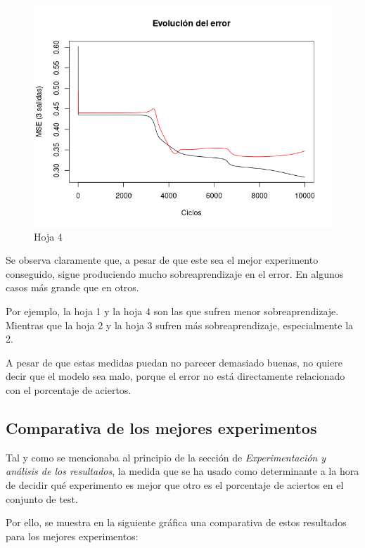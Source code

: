 \documentclass{uc3mpracticas}
\begin{document}
\begin{figure}[!h]
\begin{minipage}{.52\textwidth}
  \includegraphics[width=.8\linewidth]{Images/best_fold4.png}
  \caption*{Hoja 4}
\end{minipage}
\end{figure}

Se observa claramente que, a pesar de que este sea el mejor experimento conseguido, sigue produciendo mucho sobreaprendizaje en el error. En algunos casos más grande que en otros.

\vspace{2mm}

Por ejemplo, la hoja 1 y la hoja 4 son las que sufren menor sobreaprendizaje. Mientras que la hoja 2 y la hoja 3 sufren más sobreaprendizaje, especialmente la 2.

\vspace{2mm}

A pesar de que estas medidas puedan no parecer demasiado buenas, no quiere decir que el modelo sea malo, porque el error no está directamente relacionado con el porcentaje de aciertos.



\subsection{Comparativa de los mejores experimentos}

Tal y como se mencionaba al principio de la sección de  \textit{Experimentación y análisis de los resultados}, la medida que se ha usado como determinante a la hora de decidir qué experimento es mejor que otro es el porcentaje de aciertos en el conjunto de test.

\vspace{2mm}

Por ello, se muestra en la siguiente gráfica una comparativa de estos resultados para los mejores experimentos:
\end{document}

